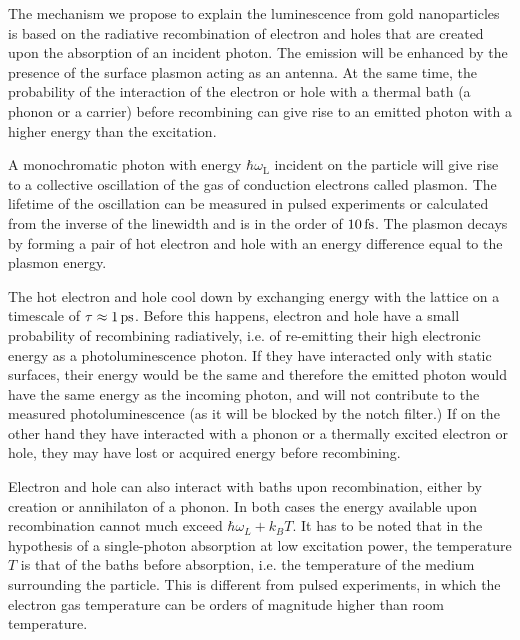 The mechanism we propose to explain the luminescence from gold nanoparticles is
based on the radiative recombination of electron and holes that are created upon
the absorption of an incident photon\cite{Dulkeith2004,Mooradian1969}. The
emission will be enhanced by the presence of the surface plasmon acting as an
antenna\cite{Mohamed2000}. At the same time, the probability of the interaction
of the electron or hole with a thermal bath (a phonon or a carrier) before
recombining can give rise to an emitted photon with a higher energy than the
excitation\cite{Hodak2000,Giri2015,Arbouet2003a}.

A monochromatic photon with energy $\hbar\omega_\textrm{L}$ incident on the
particle will give rise to a collective oscillation of the gas of conduction
electrons called plasmon. The lifetime of the oscillation can be measured in
pulsed experiments or calculated from the inverse of the linewidth and is in the
order of $10\,\textrm{fs}$\cite{Sonnichsen2002}. The plasmon decays by forming a pair of
hot electron and hole with an energy difference equal to the plasmon
energy\cite{Sundararaman2014,Brongersma2015,AlejandroManjavacasJunG.LiuVikramKulkarni2014}.

The hot electron and hole cool down by exchanging energy with the lattice on a
timescale of $\tau\approx1\,\textrm{ps}$\cite{Pustovalov2005}. Before this happens,
electron and hole have a small probability of recombining radiatively, i.e. of 
re-emitting their high electronic energy as a photoluminescence photon. If they
have interacted only with static surfaces, their energy would be the same and
therefore the emitted photon would have the same energy as the incoming
photon, and will not contribute to the measured photoluminescence (as it will be
blocked by the notch filter.) If on the other hand they have interacted with a
phonon or a thermally excited electron or hole, they may have lost or acquired
energy before recombining.

Electron and hole can also interact with baths upon recombination, either by
creation or annihilaton of a phonon. In both cases the energy available upon
recombination cannot much exceed $\hbar\omega_L+k_BT$. It has to be noted that
in the hypothesis of a single-photon absorption at low excitation power, the
temperature $T$ is that of the baths before absorption, i.e. the temperature of
the medium surrounding the particle. This is different from pulsed experiments,
in which the electron gas temperature can be orders of magnitude higher than
room temperature\cite{Baffou2013a}. 


